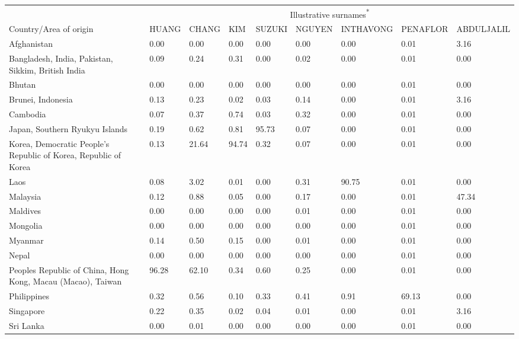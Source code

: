 \documentclass[
  landscape]{article}
\begin{document}
\begin{table}[!h]
\centering
\begin{threeparttable}
\begin{tabular}[t]{>{\raggedright\arraybackslash}p{5cm}llllllll}
\toprule
\multicolumn{1}{c}{ } & \multicolumn{8}{c}{Illustrative surnames\textsuperscript{*}} \\
\cmidrule(l{3pt}r{3pt}){2-9}
Country/Area of origin & HUANG        & CHANG        & KIM          & SUZUKI       & NGUYEN       & INTHAVONG    & PENAFLOR     & ABDULJALIL  \\
\midrule
Afghanistan & 0.00 & 0.00 & 0.00 & 0.00 & 0.00 & 0.00 & 0.01 & 3.16\\
Bangladesh, India, Pakistan, Sikkim, British India & 0.09 & 0.24 & 0.31 & 0.00 & 0.02 & 0.00 & 0.01 & 0.00\\
Bhutan & 0.00 & 0.00 & 0.00 & 0.00 & 0.00 & 0.00 & 0.01 & 0.00\\
Brunei, Indonesia & 0.13 & 0.23 & 0.02 & 0.03 & 0.14 & 0.00 & 0.01 & 3.16\\
Cambodia & 0.07 & 0.37 & 0.74 & 0.03 & 0.32 & 0.00 & 0.01 & 0.00\\
\addlinespace
Japan, Southern Ryukyu Islands & 0.19 & 0.62 & 0.81 & 95.73 & 0.07 & 0.00 & 0.01 & 0.00\\
Korea, Democratic People’s Republic of Korea, Republic of Korea & 0.13 & 21.64 & 94.74 & 0.32 & 0.07 & 0.00 & 0.01 & 0.00\\
Laos & 0.08 & 3.02 & 0.01 & 0.00 & 0.31 & 90.75 & 0.01 & 0.00\\
Malaysia & 0.12 & 0.88 & 0.05 & 0.00 & 0.17 & 0.00 & 0.01 & 47.34\\
Maldives & 0.00 & 0.00 & 0.00 & 0.00 & 0.01 & 0.00 & 0.01 & 0.00\\
\addlinespace
Mongolia & 0.00 & 0.00 & 0.00 & 0.00 & 0.00 & 0.00 & 0.01 & 0.00\\
Myanmar & 0.14 & 0.50 & 0.15 & 0.00 & 0.01 & 0.00 & 0.01 & 0.00\\
Nepal & 0.00 & 0.00 & 0.00 & 0.00 & 0.00 & 0.00 & 0.01 & 0.00\\
Peoples Republic of China, Hong Kong, Macau (Macao), Taiwan & 96.28 & 62.10 & 0.34 & 0.60 & 0.25 & 0.00 & 0.01 & 0.00\\
Philippines & 0.32 & 0.56 & 0.10 & 0.33 & 0.41 & 0.91 & 69.13 & 0.00\\
\addlinespace
Singapore & 0.22 & 0.35 & 0.02 & 0.04 & 0.01 & 0.00 & 0.01 & 3.16\\
Sri Lanka & 0.00 & 0.01 & 0.00 & 0.00 & 0.00 & 0.00 & 0.01 & 0.00\\

\end{tabular}
\end{threeparttable}
\end{table}
\end{document}
